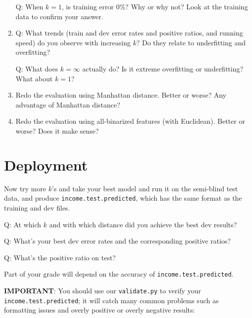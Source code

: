 \documentclass[11pt]{article}
\begin{document}
\begin{enumerate}
Q: When $k=1$, is training error 0\%? Why or why not? Look at the training data to confirm your answer.


\item
  Q: What trends (train and dev error rates and positive ratios,
  and running speed) do you observe with increasing $k$? 
  Do they relate to underfitting and overfitting?

  Q: What does $k=\infty$ actually do? Is it extreme overfitting or underfitting?
  What about $k=1$?

\item Redo the evaluation using Manhattan distance. Better or worse? Any advantage of Manhattan distance?

\item Redo the evaluation using all-binarized features (with Euclidean). Better or worse? Does it make sense?

%
%

\end{enumerate}

\section{Deployment}

Now try more $k$'s and take your best model
and run it on the semi-blind test data, and produce \verb|income.test.predicted|,
which has the same format as the training and dev files.
 
Q: At which $k$ and with which distance did you achieve the best dev results?

Q: What's your best dev error rates and the corresponding positive ratios? 

Q: What's the positive ratio on test?

Part of your grade will depend on the accuracy of \verb|income.test.predicted|.

\bigskip

{\bf IMPORTANT}: You should use our \verb|validate.py| to verify your \verb|income.test.predicted|;
it will catch many common problems such as formatting issues and overly positive or overly negative results:
\end{document}
